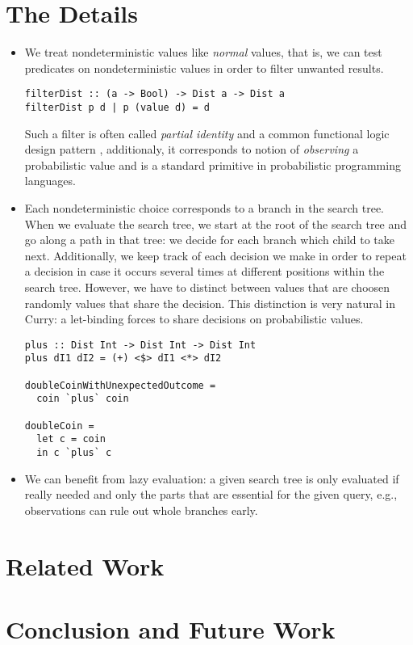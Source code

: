 \documentclass[
12pt, %
a4paper, %
oneside, %
]{llncs}
\begin{document}
\section{The Details}

\begin{itemize}

\item We treat nondeterministic values like \emph{normal} values, that
  is, we can test predicates on nondeterministic values in order to
  filter unwanted results. %

\begin{verbatim}
filterDist :: (a -> Bool) -> Dist a -> Dist a
filterDist p d | p (value d) = d
\end{verbatim}

  Such a filter is often called \emph{partial identity} and a common
  functional logic design pattern \cite{funcLogPattern}, additionaly,
  it corresponds to notion of \emph{observing} a probabilistic value
  and is a standard primitive in probabilistic programming
  languages. %
 
\item Each nondeterministic choice corresponds to a branch in the
  search tree. %
  When we evaluate the search tree, we start at the root of the search
  tree and go along a path in that tree: we decide for each branch
  which child to take next. %
  Additionally, we keep track of each decision we make in order to
  repeat a decision in case it occurs several times at different
  positions within the search tree. %
  However, we have to distinct between values that are choosen
  randomly values that share the decision. %
  This distinction is very natural in Curry: a let-binding forces to
  share decisions on probabilistic values. %

\begin{verbatim}
plus :: Dist Int -> Dist Int -> Dist Int
plus dI1 dI2 = (+) <$> dI1 <*> dI2

doubleCoinWithUnexpectedOutcome =
  coin `plus` coin

doubleCoin =
  let c = coin
  in c `plus` c
\end{verbatim}

\item We can benefit from lazy evaluation: a given search tree is only
  evaluated if really needed and only the parts that are essential for
  the given query, e.g., observations can rule out whole branches
  early. %

\end{itemize}

\section{Related Work}

\section{Conclusion and Future Work}



\end{document}
